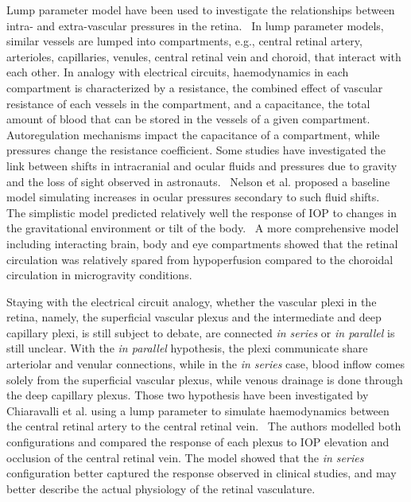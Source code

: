 \documentclass[12pt,a4paper]{journal}
\begin{document}
Lump parameter model have been used to investigate the relationships between intra- and extra-vascular pressures in the retina.~\cite{Chiaravalli_2021,Fawzi_2019,Guidoboni_2014a,Nelson_2017,Petersen_2022,Prudhomme_2021,Sala_2020,Salerni_2019}
In lump parameter models, similar vessels are lumped into compartments, e.g., central retinal artery, arterioles, capillaries, venules, central retinal vein and choroid, that interact with each other.
In analogy with electrical circuits, haemodynamics in each compartment is characterized by a resistance, the combined effect of vascular resistance of each vessels in the compartment, and a capacitance, the total amount of blood that can be stored in the vessels of a given compartment.
Autoregulation mechanisms impact the capacitance of a compartment, while pressures change the resistance coefficient.
Some studies have investigated the link between shifts in intracranial and ocular fluids and pressures due to gravity and the loss of sight observed in astronauts.~\cite{Nelson_2017,Petersen_2022,Salerni_2019}
Nelson et al. proposed a baseline model simulating increases in ocular pressures secondary to such fluid shifts.~\cite{Nelson_2017}
The simplistic model predicted relatively well the response of IOP to changes in the gravitational environment or tilt of the body.~\cite{Nelson_2017,Petersen_2022}
A more comprehensive model including interacting brain, body and eye compartments showed that the retinal circulation was relatively spared from hypoperfusion compared to the choroidal circulation in microgravity conditions.~\cite{Salerni_2019}

Staying with the electrical circuit analogy, whether the vascular plexi in the retina, namely, the superficial vascular plexus and the intermediate and deep capillary plexi, is still subject to debate, are connected \textit{in series} or \textit{in parallel} is still unclear.
With the \textit{in parallel} hypothesis, the plexi communicate share arteriolar and venular connections, while in the \textit{in series} case, blood inflow comes solely from the superficial vascular plexus, while venous drainage is done through the deep capillary plexus.
Those two hypothesis have been investigated by Chiaravalli et al. using a lump parameter to simulate haemodynamics between the central retinal artery to the central retinal vein.~\cite{Chiaravalli_2021}
The authors modelled both configurations and compared the response of each plexus to IOP elevation and occlusion of the central retinal vein.
The model showed that the \textit{in series} configuration better captured the response observed in clinical studies, and may better describe the actual physiology of the retinal vasculature.
\end{document}
